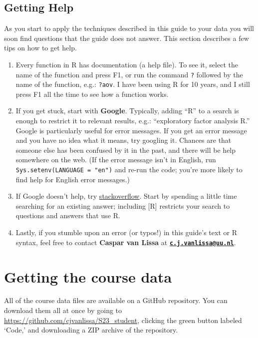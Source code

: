 \documentclass[
]{book}
\providecommand{\tightlist}{%
  \setlength{\itemsep}{0pt}\setlength{\parskip}{0pt}}
\begin{document}
\hypertarget{getting-help}{%
\subsection{Getting Help}\label{getting-help}}

As you start to apply the techniques described in this guide to your data you will soon find questions that the guide does not answer. This section describes a few tips on how to get help.

\begin{enumerate}
\def\labelenumi{\arabic{enumi}.}
\tightlist
\item
  Every function in R has documentation (a help file). To see it, select the name of the function and press F1, or run the command \texttt{?} followed by the name of the function, e.g.: \texttt{?aov}. I have been using R for 10 years, and I still press F1 all the time to see how a function works.
\item
  If you get stuck, start with \textbf{Google}. Typically, adding ``R'' to a search is enough to restrict it to relevant results, e.g.: ``exploratory factor analysis R.'' Google is particularly useful for error messages. If you get an error message and you have no idea what it means, try googling it. Chances are that someone else has been confused by it in the past, and there will be help somewhere on the web. (If the error message isn't in English,
  run \texttt{Sys.setenv(LANGUAGE\ =\ "en")} and re-run the code; you're
  more likely to find help for English error messages.)
\item
  If Google doesn't help, try \href{https://stackoverflow.com}{stackoverflow}. Start by spending a little time searching for an existing answer; including {[}R{]} restricts your search to questions and answers that use R.
\item
  Lastly, if you stumble upon an error (or typos!) in this guide's text or R syntax, feel free to contact \textbf{Caspar van Lissa} at \textbf{\href{mailto:c.j.vanlissa@uu.nl}{\nolinkurl{c.j.vanlissa@uu.nl}}}.
\end{enumerate}

\hypertarget{getting-the-course-data}{%
\section{Getting the course data}\label{getting-the-course-data}}

All of the course data files are available on a GitHub repository. You can download them all at once by going to \url{https://github.com/cjvanlissa/S23_student}, clicking the green button labeled `Code,' and downloading a ZIP archive of the repository.
\end{document}
